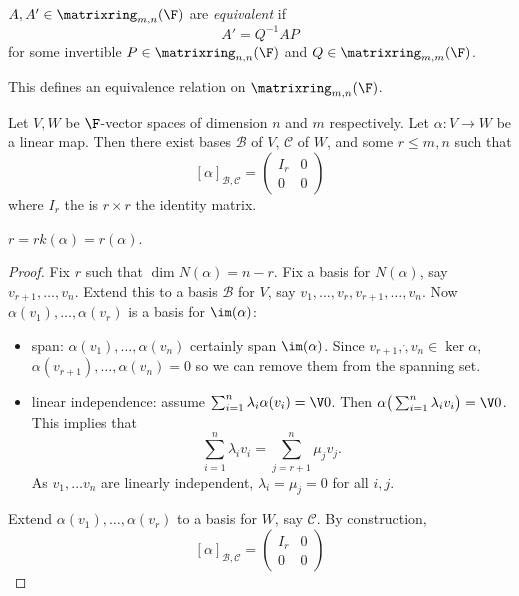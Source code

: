 \documentclass[a4paper]{article}
\newcommand*{\M}{\matrixring}
\newcommand*{\basis}{\mathcal}
\theoremstyle{definition}
\begin{document}
\begin{definition}
  \(A, A' \in \M_{m,n}(\F)\) are \emph{equivalent} if
  \[
    A' = Q^{-1}AP
  \]
  for some invertible \(P\in \M_{n,n}(\F)\) and \(Q\in \M_{m,m}(\F)\).
\end{definition}

\begin{note}
  This defines an equivalence relation on \(\M_{m,n}(\F)\).
\end{note}

\begin{proposition}
  Let \(V, W\) be \(\F\)-vector spaces of dimension \(n\) and \(m\) respectively. Let \(\alpha:V\to W\) be a linear map. Then there exist bases \(\basis B\) of \(V\), \(\basis C\) of \(W\), and some \(r\leq m,n\) such that
  \[
    [\alpha]_{\basis B,\basis C} =
    \begin{pmatrix}
      I_r & 0 \\
      0 & 0 
    \end{pmatrix}
  \]
  where \(I_r\) the is \(r\times r\) the identity matrix.
\end{proposition}

\begin{note}
  \(r = rk(\alpha) = r(\alpha)\).
\end{note}

\begin{proof}
  Fix \(r\) such that \(\dim N(\alpha) = n-r\). Fix a basis for \(N(\alpha)\), say \(v_{r+1},\dots,v_n\). Extend this to a basis \(\basis B\) for \(V\), say \(v_1,\dots,v_r,v_{r+1},\dots,v_n\). Now \(\alpha(v_1),\dots,\alpha(v_r)\) is a basis for \(\im(\alpha)\):
  \begin{itemize}
  \item span: \(\alpha(v_1),\dots, \alpha(v_n)\) certainly span \(\im(\alpha)\). Since \(v_{r+1},\dot,v_n \in \ker \alpha\), \(\alpha(v_{r+1}),\dots,\alpha(v_n) = 0\) so we can remove them from the spanning set.
  \item linear independence: assume \(\sum_{i=1}^{n}\lambda_i \alpha(v_i) =\V 0 \). Then \(\alpha \big(\sum_{i=1}^n\lambda_iv_i\big) =\V0\). This implies that
    \[
      \sum_{i=1}^{n}\lambda_iv_i = \sum_{j=r+1}^{n}\mu_jv_j.
    \]
    As \(v_1,\dots v_n\) are linearly independent, \(\lambda_i=\mu_j=0\) for all \(i,j\).
  \end{itemize}
  Extend \(\alpha(v_1),\dots,\alpha(v_r)\) to a basis for \(W\), say \(\basis C\). By construction,
  \[
    [\alpha]_{\basis B,\basis C} =
    \begin{pmatrix}
      I_r & 0 \\
      0 & 0
    \end{pmatrix}
  \]
\end{proof}
\end{document}
